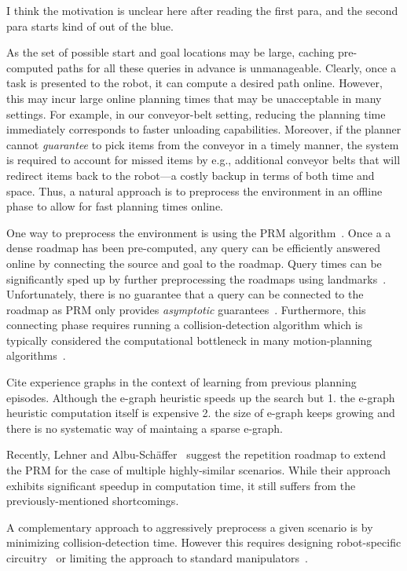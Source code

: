 \documentclass[letterpaper]{article} %
\begin{document}
{\color{blue} I think the motivation is unclear here after reading the first para, and the second para starts kind of out of the blue.}

As the set of possible start and goal locations may be large, caching pre-computed paths for all these queries in advance is unmanageable. 
Clearly, once a task is presented to the robot, it can compute a desired path online.
However, this may incur large online planning times that may be unacceptable in many settings.
For example, in our conveyor-belt setting, reducing the planning time immediately corresponds to faster unloading capabilities. 
Moreover, if the planner cannot \emph{guarantee} to pick items from the conveyor in a timely manner, the system is required to account for missed items by e.g., additional conveyor belts that will redirect items back to the robot---a costly backup in terms of both time and space.
Thus, a natural approach is to preprocess the environment in an offline phase to allow for fast planning times online.

One way to preprocess the environment is using the \textsf{PRM} algorithm~\cite{kavraki1996probabilistic}.
Once a a dense roadmap has been pre-computed, any query can be efficiently answered online by connecting the source and goal to the roadmap. 
Query times can be significantly sped up by further preprocessing the roadmaps using landmarks~\cite{paden2017landmark}.
Unfortunately, there is no guarantee that a query can be connected to the roadmap as \textsf{PRM} only provides \emph{asymptotic} guarantees~\cite{KKL98}.
Furthermore, this connecting phase requires running a collision-detection algorithm which is typically considered the computational bottleneck in many motion-planning algorithms~\cite{L06}.

{\color{blue} Cite experience graphs in the context of learning from previous planning episodes. Although the e-graph heuristic speeds up the search but 1. the e-graph heuristic computation itself is expensive 2. the size of e-graph keeps growing and there is no systematic way of maintaing a sparse e-graph.}

Recently, Lehner and  Albu{-}Sch{\"{a}}ffer~\cite{LA18} suggest the repetition roadmap to extend the \textsf{PRM} for the case of multiple highly-similar scenarios.
While their approach exhibits significant speedup in computation time, it still suffers from the previously-mentioned shortcomings.

A complementary approach to aggressively preprocess a given scenario is by minimizing collision-detection time.
However this requires designing robot-specific
circuitry~\cite{MFQSK16}
or limiting the approach to standard manipulators~\cite{YMILV18}.
\end{document}
